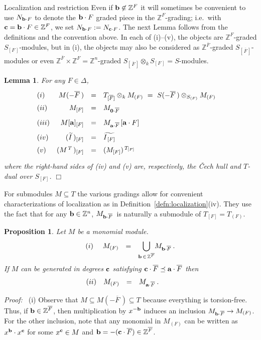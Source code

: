 \documentclass[12pt,leqno]{article}
\newtheorem{lemma}[thm]{Lemma}
\newtheorem{prop}[thm]{Proposition}
\def\aa{{{\rm \bf a}}}
\def\bb{{{\rm \bf b}}}
\def\cc{{{\rm \bf c}}}
\def\ZZ{{\mathbb Z}}
\begin{document}
\begin{section}{Localization and restriction}
\noindent
Even if $\bb \not\in \ZZ^F$ it will sometimes be convenient to use
$N_{\bb \cdot F}$ to denote the $\bb \cdot F$ graded piece in the
$\ZZ^F$-grading; i.e.\ with $\cc = \bb \cdot F \in \ZZ^F$, we set $N_{\bb
\cdot F} := N_{\cc \cdot F}$.  The next Lemma follows from the
definitions and the convention above.  In each of (i)--(v), the objects
are $\ZZ^F$-graded $S_{[F\,]}$-modules, but in (i), the objects may also
be considered as $\ZZ^{\overline F}$-graded $S_{[\,{\overline
F}\,]}$-modules or even $\ZZ^{\overline F} \times \ZZ^F = \ZZ^n$-graded
$S_{[\,{\overline F}\,]} \otimes_k S_{[F\,]} = S$-modules.

\begin{lemma} \label{lemma:localization}
For any $F \in \Delta$,
$$
\begin{array}{lrcl}
(i)
&	M(-\overline{F}^{\,}) & = & T_{[\overline{F}]} \otimes_k M_{(F)}
\ =\ 	S(-\overline{F}^{\,}) \otimes_{S_{(F)}} M_{(F)}
\phantom{\Bigl(\Bigr)}
\cr
(ii)
&	M_{[F]} & = & M_{{\bf 0} \cdot \overline{F}}
\phantom{\Bigl(\Bigr)}
\cr
(iii)
&	M[\aa]_{[F]} & = & M_{\aa \cdot \overline{F}\,}[\aa \cdot F]
\phantom{\biggl(\biggr)}
\cr
(iv)
&	(\widetilde{I^{\,}})_{[F]} & = & \widetilde{I_{\,[F]}}
\phantom{\Bigl(\Bigr)}
\cr
(v)
& 	(M^{\,T\,})_{[F]} & = & (M_{[F]})^{\,T_{[F]}}
\phantom{\Bigl(\Bigr)}
\cr
\end{array}
$$
where the right-hand sides of (iv) and (v) are, respectively, the \v Cech
hull and $T$-dual over $S_{[F]}$. \hfill $\Box$
\end{lemma} 

For submodules $M \subseteq T$ the various gradings allow for convenient
characterizations of localiza\-tion as in
Definition~\ref{defn:localization}(iv).  They use the fact that for any
$\bb \in \ZZ^n$, $M_{\bb \cdot \overline{F}}\,$ is naturally a submodule
of $T_{[F]} = T_{(F)}$.

\begin{prop} \label{prop:unions}
Let $M$ be a monomial module.
$$
\begin{array}{lrcl}
(i)\phantom{i}
&	M_{(F)}
& = &
	{\displaystyle \bigcup_{\bb\,\in\,\ZZ^{\overline{F}}}}
	M_{\bb \cdot \overline{F}}\:.
\end{array}
$$
If $M$ can be generated in degrees $\cc$ satisfying $\cc \cdot
\overline{F} \preceq \aa \cdot \overline{F}$ then
$$
\begin{array}{lrcl}
(ii)
&	M_{(F)}
& = &
	M_{\aa \cdot \overline{F}}\:.
	\phantom{\scriptstyle \bb\,\in\,\ZZ^{\overline{F}}\!}
\end{array}
$$
\end{prop}
{\it Proof:\ } (i) Observe that $M \subseteq M(-\overline{F}^{\,})
\subseteq T$ because everything is torsion-free.  Thus, if $\bb \in
\ZZ^{\overline{F}}$, then multiplication by $x^{-\bb}$ induces an
inclusion $M_{\bb \cdot \overline{F}} \to M_{(F)}$.  For the other
inclusion, note that any monomial in $M_{(F)}$ can be written as $x^\bb
\cdot x^\cc$ for some $x^\cc \in M$ and $\bb = -(\cc \cdot \overline{F})
\in \ZZ^{\overline{F}}$.


\end{section}
\end{document}
